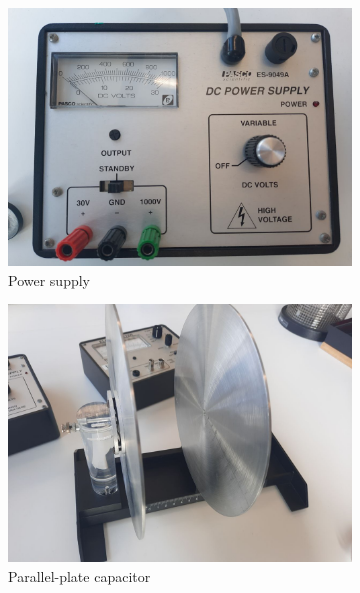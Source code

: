 \begin{figure}[H]
    \begin{subfigure}[b]{0.33\textwidth}
        \centering
        \includegraphics[width=\textwidth]{capacitors/img/setup/power_supply.jpg}
        \caption{Power supply}
    \end{subfigure}
    \begin{subfigure}[b]{0.33\textwidth}
        \centering
        \includegraphics[width=\textwidth]{capacitors/img/setup/capacitor.jpg}
        \caption{Parallel-plate capacitor}
    \end{subfigure}
    \begin{subfigure}[b]{0.33\textwidth}
        \centering

\end{subfigure}
\end{figure}
